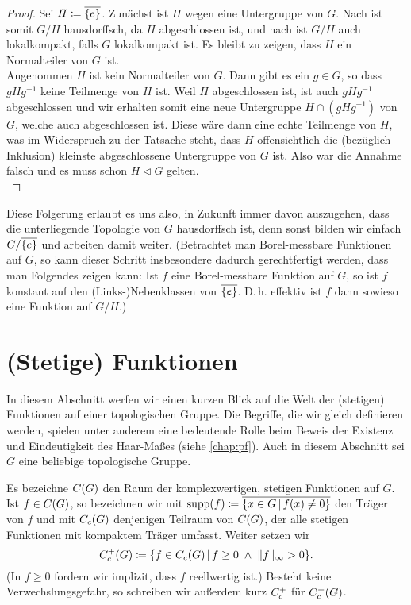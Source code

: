 \begin{proof}
    Sei $H\coloneqq \overline{\{e\}}$. 
    Zunächst ist $H$ wegen  eine Untergruppe von $G$.
    Nach  ist somit $G/H$ hausdorffsch, da $H$
    abgeschlossen ist, und nach  ist $G/H$ auch
    lokalkompakt, falls $G$ lokalkompakt ist. Es bleibt zu zeigen, dass $H$ ein
    Normalteiler von $G$ ist.
    \\
    Angenommen $H$ ist kein Normalteiler von $G$. Dann gibt es ein $g\in G$,
    so dass $gHg^{-1}$ keine Teilmenge von $H$ ist. Weil $H$ abgeschlossen ist,
    ist auch $gHg^{-1}$ abgeschlossen und wir erhalten somit eine neue
    Untergruppe $H \cap (gHg^{-1})$ von $G$, welche auch abgeschlossen ist.
    Diese wäre dann eine echte Teilmenge von $H$, was im Widerspruch zu
    der Tatsache steht, dass $H$ offensichtlich die (bezüglich Inklusion)
    kleinste abgeschlossene Untergruppe von $G$ ist. Also war die Annahme falsch
    und es muss schon $H\triangleleft G$ gelten.
    \\
\end{proof}

Diese Folgerung erlaubt es uns also, in Zukunft immer davon auszugehen, dass die
unterliegende Topologie von $G$ hausdorffsch ist, denn sonst bilden wir einfach
$G/\overline{\{e\}}$ und arbeiten damit weiter. (Betrachtet man Borel-messbare
Funktionen auf $G$, so kann dieser Schritt insbesondere dadurch gerechtfertigt
werden, dass man Folgendes zeigen kann: Ist $f$ eine Borel-messbare Funktion auf
$G$, so ist $f$ konstant auf den (Links-)Nebenklassen von $\overline{\{e\}}$.
D.\,h. effektiv ist $f$ dann sowieso eine Funktion auf $G/H$.)


\section{(Stetige) Funktionen}
In diesem Abschnitt werfen wir einen kurzen Blick auf die Welt der (stetigen)
Funktionen auf einer topologischen Gruppe. Die Begriffe, die wir gleich
definieren werden, spielen unter anderem eine bedeutende Rolle beim Beweis der
Existenz und Eindeutigkeit des Haar-Maßes (siehe \cref{chap:pf}).
Auch in diesem Abschnitt sei $G$ eine beliebige topologische Gruppe.

\begin{thNotation}
    \label{tg:notation:contcompsupp}
    Es bezeichne $C(G)$ den Raum der komplexwertigen, stetigen
    Funktionen auf $G$. Ist $f\in C(G)$, so bezeichnen wir mit 
    $\supp(f) \defeq \setclosure{ \{ x\in G \Mid f(x) \neq 0 \} }$
    den Träger von $f$ und mit $C_c(G)$ denjenigen Teilraum von
    $C(G)$, der alle stetigen Funktionen mit kompaktem Träger umfasst.
    Weiter setzen wir
    \[ \contcompplus(G) \defeq \{ f\in \contcomp(G) \Mid 
        f \geq 0 \;\wedge\; \supnorm{f} > 0 \}
    . \]
    (In $f\geq 0$ fordern wir implizit, dass $f$ reellwertig ist.)
    Besteht keine Verwechslungsgefahr, so schreiben wir außerdem kurz
    $C_c^+$ für $C_c^+(G)$.
\end{thNotation}

